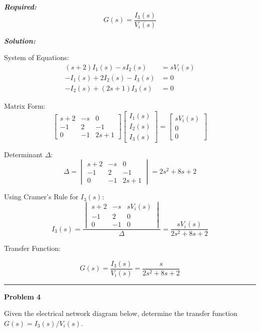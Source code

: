 ﻿\documentclass[11pt]{article}
\begin{document}
\noindent \textbf{\textit{Required:}}
\[
G(s) = \frac{I_3(s)}{V_i(s)}
\]

\vspace{12pt}

\noindent \textbf{\textit{Solution:}}

\bigskip

{System of Equations:}
\[
\begin{aligned}
(s + 2)I_1(s) - s I_2(s) &= sV_i(s) \\
-I_1(s) + 2I_2(s) - I_3(s) &= 0 \\
-I_2(s) + (2s + 1)I_3(s) &= 0
\end{aligned}
\]

{Matrix Form:}
\[
\begin{bmatrix}
s + 2 & -s & 0 \\
-1 & 2 & -1 \\
0 & -1 & 2s + 1
\end{bmatrix}
\begin{bmatrix}
I_1(s) \\ I_2(s) \\ I_3(s)
\end{bmatrix}
=
\begin{bmatrix}
sV_i(s) \\ 0 \\ 0
\end{bmatrix}
\]

{Determinant \(\Delta\):}
\[
\Delta =
\begin{vmatrix}
s + 2 & -s & 0 \\
-1 & 2 & -1 \\
0 & -1 & 2s + 1
\end{vmatrix}
= 2s^2 + 8s + 2
\]

{Using Cramer's Rule for \(I_3(s)\):}
\[
I_3(s) =
\frac{
\begin{vmatrix}
s + 2 & -s & sV_i(s) \\
-1 & 2 & 0 \\
0 & -1 & 0
\end{vmatrix}
}
{\Delta}
= \frac{sV_i(s)}{2s^2 + 8s + 2}
\]


{Transfer Function:}

\[
\boxed{
G(s) = \frac{I_3(s)}{V_i(s)} = \frac{s}{2s^2 + 8s + 2}
}
\]


\newpage
  \setcounter{page}{5}
\noindent\rule{\textwidth}{1pt}
\noindent\textbf{Problem 4} \hfill 

\noindent Given the electrical network diagram below, determine the transfer function $G(s) = I_3(s)/V_i(s)$.
\end{document}
